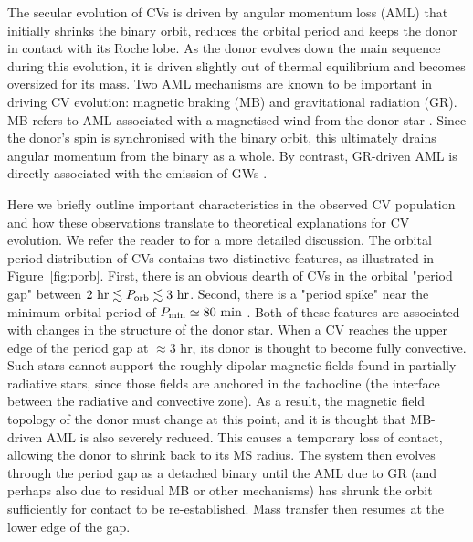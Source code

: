 \documentclass[fleqn,usenatbib]{mnras}
\begin{document}
The secular evolution of CVs is driven by angular momentum loss (AML) that initially shrinks the binary orbit, reduces the orbital period and keeps the donor in contact with its Roche lobe. As the donor evolves down the main sequence during this evolution, it is driven slightly out of thermal equilibrium and becomes oversized for its mass. Two AML mechanisms are known to be important in driving CV evolution: magnetic braking (MB) and gravitational radiation (GR). MB refers to AML associated with a magnetised wind from the donor star \citep[e.g.][]{Verbunt1981, Rappaport1983}. Since the donor's spin is synchronised with the binary orbit, this ultimately drains angular momentum from the binary as a whole. By contrast, GR-driven AML is directly associated with the emission of GWs \citep[e.g.][]{Peters1964}. 

Here we briefly outline important characteristics in the observed CV population and how these observations translate to theoretical explanations for CV evolution. We refer the reader to \citet{knigge11} for a more detailed discussion. The orbital period distribution of CVs contains two distinctive features, as illustrated in Figure~\ref{fig:porb}. First, there is an obvious dearth of CVs in the orbital "period gap" between $2~\mathrm{hr} \lesssim P_{\rm{orb}} \lesssim 3~\mathrm{hr}$. Second, there is a "period spike" near the minimum orbital period of $P_{\rm min} \simeq 80~\mathrm{min}$ \citep[e.g.][]{gansicke09}. Both of these features are associated with changes in the structure of the donor star. When a CV reaches the upper edge of the period gap at $\approx 3$ hr, its donor is thought to become fully convective. Such stars cannot support the roughly dipolar magnetic fields found in partially radiative stars, since those fields are anchored in the tachocline (the interface between the radiative and convective zone). As a result, the magnetic field topology of the donor must change at this point, and it is thought that MB-driven AML is also severely reduced. This causes a temporary loss of contact, allowing the donor to shrink back to its MS radius. The system then evolves through the period gap as a detached binary until the AML due to GR (and perhaps also due to residual MB or other mechanisms) has shrunk the orbit sufficiently for contact to be re-established. Mass transfer then resumes at the lower edge of the gap.
\end{document}
